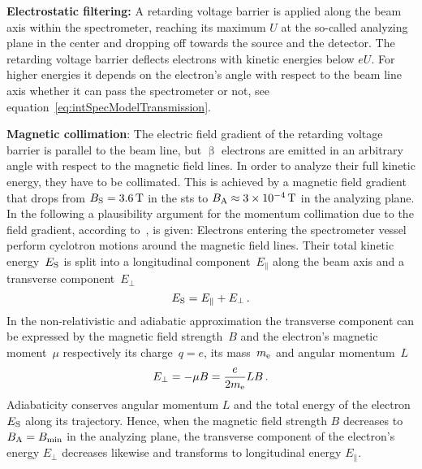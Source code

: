 {\par \textbf{Electrostatic filtering:}
A retarding voltage barrier is applied along the beam axis within the spectrometer, reaching its maximum $U$ at the so-called analyzing plane in the center and dropping off towards the source and the detector. The retarding voltage barrier deflects electrons with kinetic energies below $eU$. For higher energies it depends on the electron's angle with respect to the beam line axis whether it can pass the spectrometer or not, see equation~\eqref{eq:intSpecModelTransmission}. 

{\par \textbf{Magnetic collimation}: 
The electric field gradient of the retarding voltage barrier is parallel to the beam line, but $\upbeta$ electrons are emitted in an arbitrary angle with respect to the magnetic field lines. In order to analyze their full kinetic energy, they have to be collimated. This is achieved by a magnetic field gradient that drops from $B_\mathrm{S}=\SI{3.6}{T}$ in the \gls{sts} to $B_\mathrm{A}\approx\SI{3e-4}{T}$ in the analyzing plane. In the following a plausibility argument for the momentum collimation due to the field gradient, according to~\cite{Angrik:2005ep}, is given: Electrons entering the spectrometer vessel perform cyclotron motions around the magnetic field lines. Their total kinetic energy~$E_\mathrm{S}$ is split into a longitudinal component~$E_\parallel$ along the beam axis and a transverse component~$E_\bot$
\begin{equation}
\label{eq:totalKinElecEnergy}
E_\mathrm{S} = E_\parallel + E_\bot \text{\,.}
\end{equation}
In the non-relativistic and adiabatic approximation the transverse component can be expressed by the magnetic field strength~$B$ and the electron's magnetic moment~$\mu$ respectively its charge~$q=e$, its mass~$m_{\mathrm{e}}$ and angular momentum~$L$~\cite{jackson1975classical}
\begin{equation}
E_\bot = - \mu B = \frac{e}{2 m_{\mathrm{e}}}LB \text{\,.}
\end{equation}
Adiabaticity conserves angular momentum $L$ and the total energy of the electron $E_\mathrm{S}$ along its trajectory. Hence, when the magnetic field strength $B$ decreases to $B_\mathrm{A}=B_\mathrm{min}$ in the analyzing plane, the transverse component of the electron's energy $E_\bot$ decreases likewise and transforms to longitudinal energy $E_\parallel$.}

}
